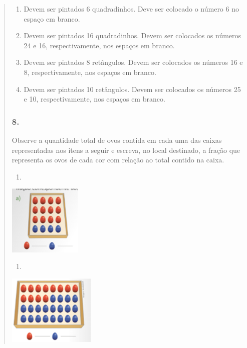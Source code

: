 \begin{enumerate}
\begin{escolha}
\begin{enumerate}
\begin{itemize}
\begin{itemize}
\begin{escolha}
\begin{quote}
\begin{escolha}
{\begin{enumerate}
\def\labelenumi{\alph{enumi})}
\item
  Devem ser pintados 6 quadradinhos. Deve ser colocado o número 6 no espaço em
  branco.
\item
  Devem ser pintados 16 quadradinhos. Devem ser colocados os números 24 e 16,
  respectivamente, nos espaços em branco.
\item
  Devem ser pintados 8 retângulos. Devem ser colocados os números 16 e 8,
  respectivamente, nos espaços em branco.
\item
  Devem ser pintados 10 retângulos. Devem ser colocados os números 25 e 10,
  respectivamente, nos espaços em branco.
\end{enumerate}

\subsubsection{8.}\label{section-111}

Observe a quantidade total de ovos contida em cada uma das caixas
representadas nos itens a seguir e escreva, no local destinado, a fração que
representa os ovos de cada cor com relação ao total contido na caixa.


\begin{enumerate}
\def\labelenumi{\alph{enumi})}
\item
\end{enumerate}

\includegraphics[width=1.37512in,height=1.31678in]{media/image118.png}

\begin{enumerate}
\def\labelenumi{\alph{enumi})}
\item
\end{enumerate}

\includegraphics[width=1.64181in,height=1.30845in]{media/image119.png}

}
\end{escolha}
\end{quote}
\end{escolha}
\end{itemize}
\end{itemize}
\end{enumerate}
\end{escolha}
\end{enumerate}
